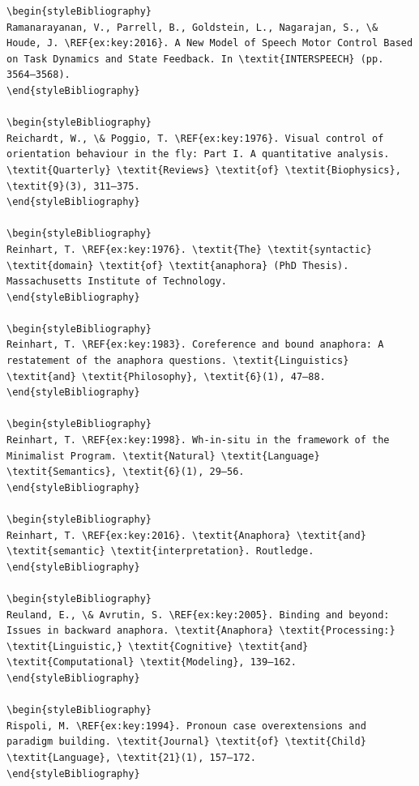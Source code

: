\begin{verbatim}
\begin{styleBibliography}
Ramanarayanan, V., Parrell, B., Goldstein, L., Nagarajan, S., \& Houde, J. \REF{ex:key:2016}. A New Model of Speech Motor Control Based on Task Dynamics and State Feedback. In \textit{INTERSPEECH} (pp. 3564–3568).
\end{styleBibliography}

\begin{styleBibliography}
Reichardt, W., \& Poggio, T. \REF{ex:key:1976}. Visual control of orientation behaviour in the fly: Part I. A quantitative analysis. \textit{Quarterly} \textit{Reviews} \textit{of} \textit{Biophysics}, \textit{9}(3), 311–375.
\end{styleBibliography}

\begin{styleBibliography}
Reinhart, T. \REF{ex:key:1976}. \textit{The} \textit{syntactic} \textit{domain} \textit{of} \textit{anaphora} (PhD Thesis). Massachusetts Institute of Technology.
\end{styleBibliography}

\begin{styleBibliography}
Reinhart, T. \REF{ex:key:1983}. Coreference and bound anaphora: A restatement of the anaphora questions. \textit{Linguistics} \textit{and} \textit{Philosophy}, \textit{6}(1), 47–88.
\end{styleBibliography}

\begin{styleBibliography}
Reinhart, T. \REF{ex:key:1998}. Wh-in-situ in the framework of the Minimalist Program. \textit{Natural} \textit{Language} \textit{Semantics}, \textit{6}(1), 29–56.
\end{styleBibliography}

\begin{styleBibliography}
Reinhart, T. \REF{ex:key:2016}. \textit{Anaphora} \textit{and} \textit{semantic} \textit{interpretation}. Routledge.
\end{styleBibliography}

\begin{styleBibliography}
Reuland, E., \& Avrutin, S. \REF{ex:key:2005}. Binding and beyond: Issues in backward anaphora. \textit{Anaphora} \textit{Processing:} \textit{Linguistic,} \textit{Cognitive} \textit{and} \textit{Computational} \textit{Modeling}, 139–162.
\end{styleBibliography}

\begin{styleBibliography}
Rispoli, M. \REF{ex:key:1994}. Pronoun case overextensions and paradigm building. \textit{Journal} \textit{of} \textit{Child} \textit{Language}, \textit{21}(1), 157–172.
\end{styleBibliography}


\end{verbatim}
